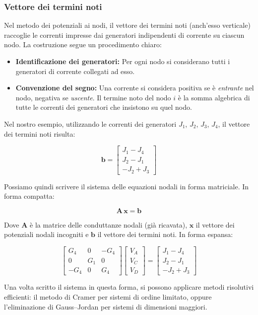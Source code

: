 \subsubsection*{Vettore dei termini noti}

Nel metodo dei potenziali ai nodi, il vettore dei termini noti (anch’esso verticale) raccoglie le correnti impresse dai generatori indipendenti di corrente su ciascun nodo. La costruzione segue un procedimento chiaro:

\begin{itemize}
\item \textbf{Identificazione dei generatori:} Per ogni nodo si considerano tutti i generatori di corrente collegati ad esso.
\item \textbf{Convenzione del segno:} Una corrente si considera positiva se è \textit{entrante} nel nodo, negativa se \textit{uscente}. Il termine noto del nodo $i$ è la somma algebrica di tutte le correnti dei generatori che insistono su quel nodo.
\end{itemize}

Nel nostro esempio, utilizzando le correnti dei generatori $J_1$, $J_2$, $J_3$, $J_4$, il vettore dei termini noti risulta:

\begin{equation}
\mathbf{b} =
\begin{bmatrix}
J_1 - J_4 \\
J_2 - J_1 \\
-J_2 + J_3
\end{bmatrix}
\end{equation}

Possiamo quindi scrivere il sistema delle equazioni nodali in forma matriciale. In forma compatta:

\begin{equation}
\mathbf{A} \, \mathbf{x} = \mathbf{b}
\end{equation}

Dove $\mathbf{A}$ è la matrice delle conduttanze nodali (già ricavata), $\mathbf{x}$ il vettore dei potenziali nodali incogniti e $\mathbf{b}$ il vettore dei termini noti. In forma espansa:

\begin{equation}
\begin{bmatrix}
G_4 & 0 & -G_4 \\
0 & G_1 & 0 \\
-G_4 & 0 & G_4
\end{bmatrix}
\begin{bmatrix}
V_A \\
V_C \\
V_D
\end{bmatrix}
=
\begin{bmatrix}
J_1 - J_4 \\
J_2 - J_1 \\
- J_2 + J_3
\end{bmatrix}
\end{equation}

Una volta scritto il sistema in questa forma, si possono applicare metodi risolutivi efficienti: il metodo di Cramer per sistemi di ordine limitato, oppure l’eliminazione di Gauss–Jordan per sistemi di dimensioni maggiori.